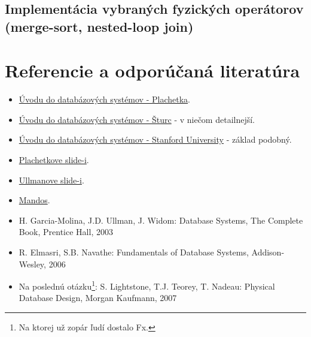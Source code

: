 \documentclass[10pt,a4paper]{article}
\begin{document}
\subsection{Implementácia vybraných fyzických operátorov (merge-sort, nested-loop join)}


\clearpage
\section*{Referencie a odporúčaná literatúra}
\begin{itemize}                                
\item \href{http://www.dcs.fmph.uniba.sk/~plachetk/TEACHING/DB2011/index.html}{Úvodu do databázových systémov - Plachetka}.        
\item \href{http://www.dcs.fmph.uniba.sk/~sturc/databazy/uvod/}{Úvodu do databázových systémov - Šturc} - v niečom detailnejší.        
\item \href{http://infolab.stanford.edu/~widom/cs145/}{Úvodu do databázových systémov - Stanford University} - základ podobný.


\item \href{http://csip.sk/uploads/plachetka\_uvod\_do\_databaz\_2011.pdf}{Plachetkove slide-i}.
\item \href{http://csip.sk/uploads/ullman.pdf}{Ullmanove slide-i}.
\item \href{http://fmfi-uk.hq.sk/Informatika/Uvod\%20Do\%20Databazovych\%20Systemov/prednasky/}{Mandos}.
\item H. Garcia-Molina, J.D. Ullman, J. Widom: Database Systems, The Complete Book, Prentice Hall, 2003
\item R. Elmasri, S.B. Navathe: Fundamentals of Database Systems, Addison-Wesley, 2006
\item Na poslednú otázku\footnote{
Na ktorej už zopár ľudí dostalo Fx.
}: S. Lightstone, T.J. Teorey, T. Nadeau: Physical Database Design, Morgan Kaufmann, 2007
\end{itemize}
\end{document}
